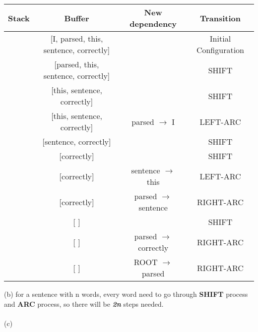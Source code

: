 \documentclass{article}
\begin{document}
\begin{center}
\begin{tabular}{ c|c|c|c }
 Stack & Buffer & New dependency & Transition \\
 \hline
 [ROOT] & [I, parsed, this, sentence, correctly] & & Initial Configuration \\
 \hline
 [ROOT, I] & [parsed, this, sentence, correctly] & & SHIFT \\
 \hline
 [ROOT, I, parsed] & [this, sentence, correctly] & & SHIFT \\
 \hline
 [ROOT, parsed] & [this, sentence, correctly] & parsed \(\rightarrow\) I & LEFT-ARC \\
 \hline
 [ROOT, parsed, this] & [sentence, correctly] & & SHIFT \\
 \hline
 [ROOT, parsed, this, sentence] & [correctly] & & SHIFT \\
 \hline
 [ROOT, parsed, sentence] & [correctly] & sentence \(\rightarrow\) this & LEFT-ARC \\
 \hline
 [ROOT, parsed] & [correctly] & parsed \(\rightarrow\) sentence & RIGHT-ARC \\
 \hline
 [ROOT, parsed, correctly] & [ ] & & SHIFT \\
 \hline
 [ROOT, parsed] & [ ] & parsed \(\rightarrow\) correctly & RIGHT-ARC \\
 \hline
 [ROOT] & [ ] & ROOT \(\rightarrow\) parsed & RIGHT-ARC
\end{tabular}
\end{center}
(b) for a sentence with n words, every word need to go through \textbf{SHIFT} process and \textbf{ARC} process, so there will be \textbf{\textit{2n}} steps needed.
\\
\\
(c) 
\end{document}
